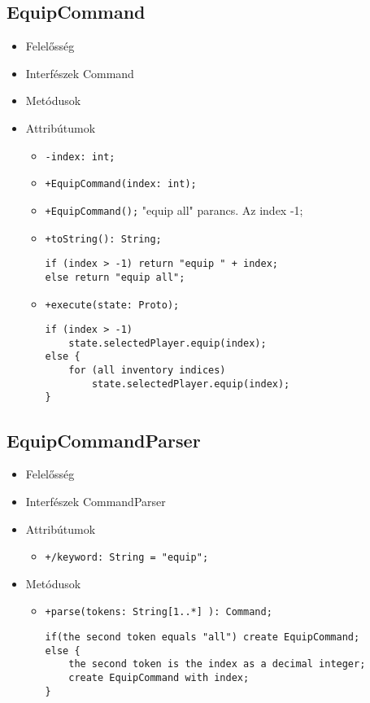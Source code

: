 \subsection{EquipCommand}
\begin{itemize}
\item Felelősség\newline
\item Interfészek\newline
Command
\item Metódusok
\item Attribútumok
	\begin{itemize}
		\item \texttt{-index: int;}
	\end{itemize}
\begin{itemize}
		\item \texttt{+EquipCommand(index: int);}
		\item \texttt{+EquipCommand();} \newline
		"equip all" parancs. Az index -1;
		\item \texttt{+toString(): String;}
		\begin{lstlisting}
if (index > -1) return "equip " + index;
else return "equip all";
		\end{lstlisting}
		\item \texttt{+execute(state: Proto);}
		\begin{lstlisting}
if (index > -1) 
	state.selectedPlayer.equip(index);
else {
	for (all inventory indices)
		state.selectedPlayer.equip(index);
}
		\end{lstlisting}
	\end{itemize}
\end{itemize}
\subsection{EquipCommandParser}
\begin{itemize}
\item Felelősség\newline
\item Interfészek\newline
CommandParser
\item Attribútumok
	\begin{itemize}
		\item \texttt{+/keyword: String = "equip";}
	\end{itemize}
\item Metódusok
\begin{itemize}
		\item \texttt{+parse(tokens: String[1..*] ): Command;}
		\begin{lstlisting}
if(the second token equals "all") create EquipCommand;
else {
	the second token is the index as a decimal integer;
	create EquipCommand with index;
}
		\end{lstlisting}
	\end{itemize}
\end{itemize}

